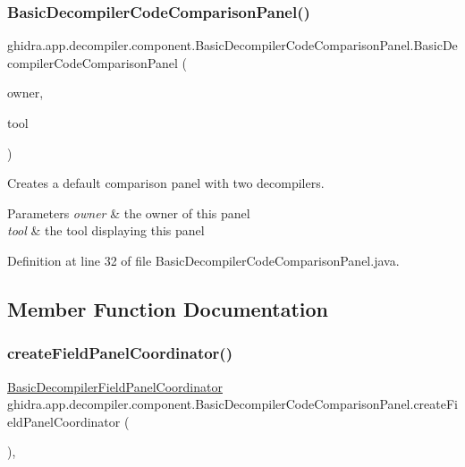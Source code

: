 \subsubsection{\texorpdfstring{BasicDecompilerCodeComparisonPanel()}{BasicDecompilerCodeComparisonPanel()}}
{\footnotesize\ttfamily ghidra.\+app.\+decompiler.\+component.\+Basic\+Decompiler\+Code\+Comparison\+Panel.\+Basic\+Decompiler\+Code\+Comparison\+Panel (\begin{DoxyParamCaption}\item[{String}]{owner,  }\item[{Plugin\+Tool}]{tool }\end{DoxyParamCaption})\hspace{0.3cm}{\ttfamily [inline]}}

Creates a default comparison panel with two decompilers. 
\begin{DoxyParams}{Parameters}
{\em owner} & the owner of this panel \\
\hline
{\em tool} & the tool displaying this panel \\
\hline
\end{DoxyParams}


Definition at line 32 of file Basic\+Decompiler\+Code\+Comparison\+Panel.\+java.



\subsection{Member Function Documentation}
\mbox{\label{classghidra_1_1app_1_1decompiler_1_1component_1_1_basic_decompiler_code_comparison_panel_a15be0eb845deaaac97dc51f9771da887}} 
\subsubsection{\texorpdfstring{createFieldPanelCoordinator()}{createFieldPanelCoordinator()}}
{\footnotesize\ttfamily \mbox{\hyperlink{classghidra_1_1app_1_1decompiler_1_1component_1_1_basic_decompiler_field_panel_coordinator}{Basic\+Decompiler\+Field\+Panel\+Coordinator}} ghidra.\+app.\+decompiler.\+component.\+Basic\+Decompiler\+Code\+Comparison\+Panel.\+create\+Field\+Panel\+Coordinator (\begin{DoxyParamCaption}{ }\end{DoxyParamCaption})\hspace{0.3cm}{\ttfamily [inline]}, {\ttfamily [protected]}}



